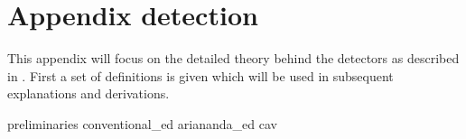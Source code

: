 \documentclass[a4paper, openany, oneside]{memoir}
\begin{document}
\section{Appendix detection}\label{app:detector}
This appendix will focus on the detailed theory behind the detectors as described in . First a set of definitions is given which will be
used in subsequent explanations and derivations.

{preliminaries}
{conventional_ed}
{ariananda_ed}
{cav}
\end{document}
